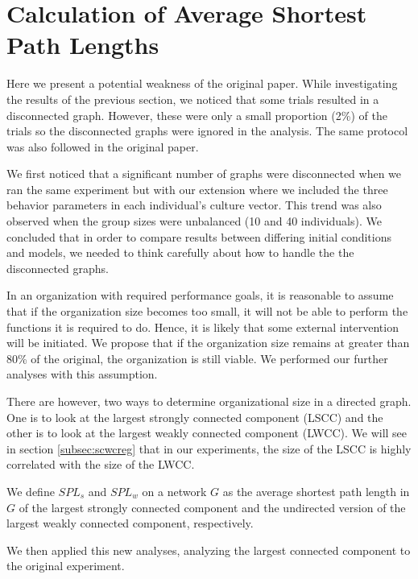 \newpage
\section{Calculation of Average Shortest Path Lengths}\label{sec:discrep}

Here we present a potential weakness of the original paper.
While investigating the results of the previous section, we
noticed that some trials resulted in a disconnected graph.
However, these were only a small proportion (2\%) of the trials
so the disconnected graphs were ignored in the analysis.
The same protocol was also followed in the original paper.

We first noticed that a significant number of graphs were
disconnected when we ran the same experiment but with our extension
where we included the three behavior parameters in each individual's
culture vector.
This trend was also observed when the group sizes were unbalanced
(10 and 40 individuals).
We concluded that in order to compare results between differing
initial conditions and models, we needed to think carefully
about how to handle the
the disconnected graphs.

In an organization with required performance goals, it is reasonable
to assume that if the organization size becomes too small,
it will not be able to perform the functions it is required to do.
Hence, it is likely that some external intervention will be initiated.
We propose that if the organization size remains at greater than 80\%
of the original, the organization is still viable.
We performed our further analyses with this assumption.

There are however, two ways to determine organizational size in a
directed graph.
One is to look at the largest strongly connected component (LSCC) and the other
is to look at the largest weakly connected component (LWCC).
We will see in section \ref{subsec:scwcreg} that in our experiments,
the size of the LSCC is highly correlated with the size of the LWCC.

\begin{defn}
    We define $SPL_s$ and $SPL_w$ on a network $G$
    as the average shortest path length in $G$ of the largest strongly connected component
    and the undirected version of the largest weakly connected component, respectively.
\end{defn}

We then applied this new analyses, analyzing the largest
connected component to the original experiment.

